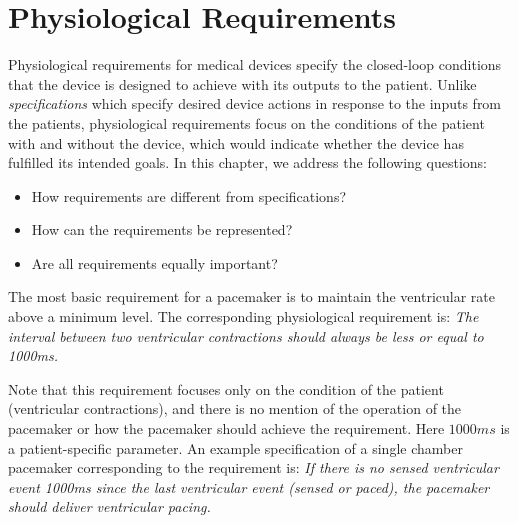 \section{Physiological Requirements}

Physiological requirements for medical devices specify the closed-loop conditions that the device is designed to achieve with its outputs to the patient. Unlike \emph{specifications} which specify desired device actions in response to the inputs from the patients, physiological requirements focus on the conditions of the patient with and without the device, which would indicate whether the device has fulfilled its intended goals. In this chapter, we address the following questions:
\begin{itemize}
	\vspace{-5pt}
	\item How requirements are different from specifications?
	\vspace{-5pt}
 	\item How can the requirements be represented?
	\vspace{-5pt}
	\item Are all requirements equally important?
\end{itemize}


The most basic requirement for a pacemaker is to maintain the ventricular rate above a minimum level. The corresponding physiological requirement is:
\noindent
 \emph{The interval between two ventricular contractions should always be less or equal to 1000ms.} 

Note that this requirement focuses only on the condition of the patient (ventricular contractions), and there is no mention of the operation of the pacemaker or how the pacemaker should achieve the requirement. Here $1000ms$ is a patient-specific parameter. An example specification of a single chamber pacemaker corresponding to the requirement is:  
\noindent
\emph{If there is no sensed ventricular event 1000ms since the last ventricular event (sensed or paced), the pacemaker should deliver ventricular pacing.}
 
